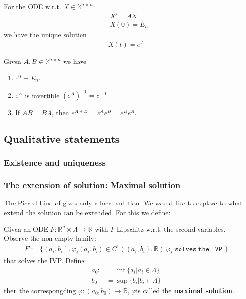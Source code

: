 \begin{theorem}
	For the ODE w.r.t. $X \in \mathbb{K}^{n \times n}$:
	\begin{align*}
		&X' = AX\\
		&X(0) = E_n
	\end{align*}
	we have the unique solution
	\begin{align*}
		X(t) = e^A
	\end{align*}
\end{theorem}

\begin{theorem}
Given $A, B \in \mathbb{K}^{n \times n}$ we have
\begin{enumerate}
	\item $e^0 = E_n$.
	\item $e^A$ is invertible $(e^A)^{-1} = e^{-A}$.
	\item If $AB = BA$, then $e^{A + B} = e^{A} e^B = e^B e^A$. 
\end{enumerate}
\end{theorem}



\subsection{Qualitative statements}
\subsubsection*{Existence and uniqueness}
\subsubsection*{The extension of solution: Maximal solution}
The Picard-Lindlof gives only a local solution. We would like to explore to what extend the solution can be extended. For this we define:
\begin{definition}
	Given an ODE $F: \mathbb{R}^n \times \Lambda \rightarrow \mathbb{R}$ with $F$ Lipschitz w.r.t. the second variables. Observe the non-empty family:
	\begin{align*}
		F:= \{ (a_i, b_i), \varphi_i(a_i, b_i) \in C^1((a_i, b_i), \mathbb{R}) | \varphi_i \texttt{ solves the IVP } \}
	\end{align*}
	that solves the IVP. Define:
	\begin{align*}
		a_0:&= \inf\{a_i| a_i \in \Lambda\}\\
		b_0:&= \sup\{b_i| b_i \in \Lambda\}
	\end{align*}
	then the correspongding $\varphi: (a_0, b_0) \rightarrow \mathbb{R}$, $\varphi$is called the \textbf{maximal solution}. 
\end{definition}

